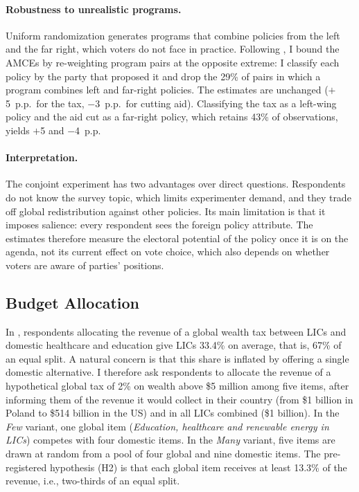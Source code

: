 \documentclass[12pt,english]{article}
\begin{document}
\paragraph{Robustness to unrealistic programs.} Uniform randomization generates programs that combine policies from the left and the far right, which voters do not face in practice. Following \cite{de_la_cuesta_improving_2022}, I bound the AMCEs by re-weighting program pairs at the opposite extreme: I classify each policy by the party that proposed it and drop the 29\% of pairs in which a program combines left and far-right policies. The estimates are unchanged ($+$5~p.p.\ for the tax, $-$3~p.p.\ for cutting aid). Classifying the tax as a left-wing policy and the aid cut as a far-right policy, which retains 43\% of observations, yields $+$5 and $-$4~p.p.

\paragraph{Interpretation.} The conjoint experiment has two advantages over direct questions. Respondents do not know the survey topic, which limits experimenter demand, and they trade off global redistribution against other policies. Its main limitation is that it imposes salience: every respondent sees the foreign policy attribute. The estimates therefore measure the electoral potential of the policy once it is on the agenda, not its current effect on vote choice, which also depends on whether voters are aware of parties' positions.

\subsection{Budget Allocation}\label{subsec:revenue_split}

In \cite{fabre_majority_2025}, respondents allocating the revenue of a global wealth tax between LICs and domestic healthcare and education give LICs 33.4\% on average, that is, 67\% of an equal split. A natural concern is that this share is inflated by offering a single domestic alternative. I therefore ask respondents to allocate the revenue of a hypothetical global tax of 2\% on wealth above \$5 million among five items, after informing them of the revenue it would collect in their country (from \$1 billion in Poland to \$514 billion in the US) and in all LICs combined (\$1 billion). In the \textit{Few} variant, one global item (\textit{Education, healthcare and renewable energy in LICs}) competes with four domestic items. In the \textit{Many} variant, five items are drawn at random from a pool of four global and nine domestic items. The pre-registered hypothesis (H2) is that each global item receives at least 13.3\% of the revenue, i.e., two-thirds of an equal split.
\end{document}
